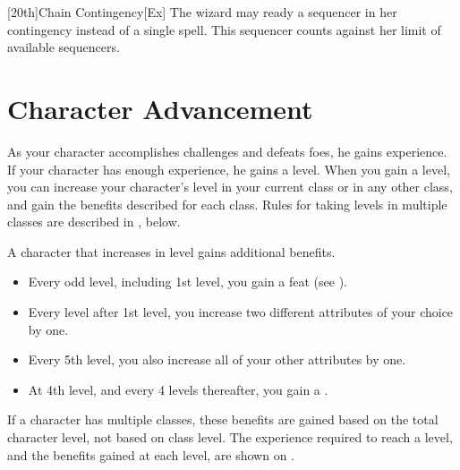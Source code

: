 [20th]{Chain Contingency}[Ex]
The wizard may ready a sequencer in her contingency instead of a single spell.
This sequencer counts against her limit of available sequencers.

\section{Character Advancement}\label{Character Advancement}

As your character accomplishes challenges and defeats foes, he gains experience.
If your character has enough experience, he gains a level.
When you gain a level, you can increase your character's level in your current class or in any other class, and gain the benefits described for each class.
Rules for taking levels in multiple classes are described in , below.

A character that increases in level gains additional benefits.
\begin{itemize}
    \item Every odd level, including 1st level, you gain a feat (see ).
    \item Every level after 1st level, you increase two different attributes of your choice by one.
    \item Every 5th level, you also increase all of your other attributes by one.
    \item At 4th level, and every 4 levels thereafter, you gain a .
\end{itemize}

If a character has multiple classes, these benefits are gained based on the total character level, not based on class level.
The experience required to reach a level, and the benefits gained at each level, are shown on .

